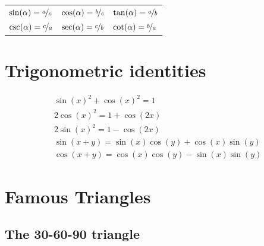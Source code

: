 \documentclass[letterpaper,9pt,fleqn]{extarticle}
\begin{document}
\begin{multicols*}{3}
   \medskip
   
   \begin{tabular}{lll}
   $\sin(\alpha) = \nicefrac{a}{c}$ & $\cos(\alpha) = \nicefrac{b}{c}$ & $\tan(\alpha) = \nicefrac{a}{b}$\\[1ex]
   $\csc(\alpha) = \nicefrac{c}{a}$ & $\sec(\alpha) = \nicefrac{c}{b}$ & $\cot(\alpha) = \nicefrac{b}{a}$  \\
   \end{tabular}

\section*{Trigonometric identities}
\vspace{-0.05in}
\begin{minipage}[c]{2.0in}

\vspace{-0.335in}
\begin{align*}
&\sin(x)^2 + \cos(x)^2 =1 \\
&2 \cos(x)^2 =  1 + \cos(2 x)\\
&2 \sin(x)^2 = 1 - \cos(2 x)\\
 &\sin\left(x +  y\right) =\sin (x) \cos (y) + \cos (x) \sin (y) \\
&\cos\left(x+y\right)=\cos (x) \cos (y) - \sin (x) \sin (y)    
\end{align*}
\end{minipage}




\section*{Famous Triangles}

\subsection*{The 30-60-90 triangle}

\end{multicols*}
\end{document}
